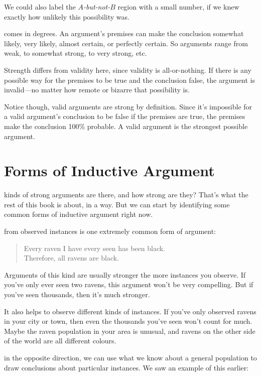 \documentclass[justified]{tufte-book}
\newenvironment{argument}{\begin{quote}\normalsize}{\end{quote}}
\theoremstyle{definition}
\theoremstyle{definition}
\theoremstyle{definition}
\theoremstyle{remark}
\begin{document}
We could also label the \emph{\(A\)-but-not-\(B\)} region with a small
number, if we knew exactly how unlikely this possibility was.

 comes in degrees. An argument's premises can make
the conclusion somewhat likely, very likely, almost certain, or
perfectly certain. So arguments range from weak, to somewhat strong, to
very strong, etc.

Strength differs from validity here, since validity is all-or-nothing.
If there is any possible way for the premises to be true and the
conclusion false, the argument is invalid---no matter how remote or
bizarre that possibility is.

Notice though, valid arguments are strong by definition. Since it's
impossible for a valid argument's conclusion to be false if the premises
are true, the premises make the conclusion 100\% probable. A valid
argument is the strongest possible argument.

\hypertarget{indargs}{%
\section{Forms of Inductive Argument}\label{indargs}}

 kinds of strong arguments are there, and how strong
are they? That's what the rest of this book is about, in a way. But we
can start by identifying some common forms of inductive argument right
now.

 from observed instances is one extremely
common form of argument:

\begin{argument}
Every raven I have every seen has been black.\\
Therefore, all ravens are black.
\end{argument}

Arguments of this kind are usually stronger the more instances you
observe. If you've only ever seen two ravens, this argument won't be
very compelling. But if you've seen thousands, then it's much stronger.

It also helps to observe different kinds of instances. If you've only
observed ravens in your city or town, then even the thousands you've
seen won't count for much. Maybe the raven population in your area is
unusual, and ravens on the other side of the world are all different
colours.

 in the opposite direction, we can use what we know
about a general population to draw conclusions about particular
instances. We saw an example of this earlier:
\end{document}
